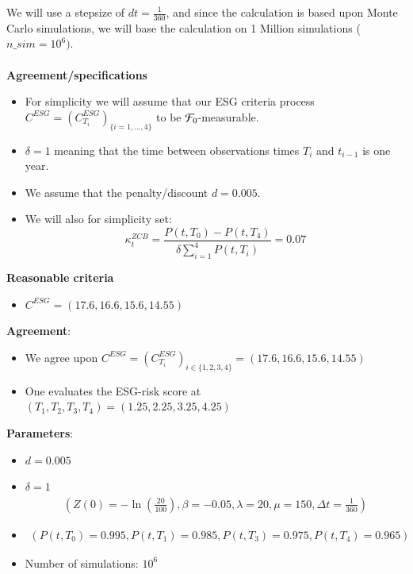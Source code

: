 We will use a stepsize of $dt = \frac{1}{360}$, and since the calculation is based upon Monte Carlo simulations, we will base the calculation on 1 Million simulations ($n\_sim = 10^{6})$. 
\\~\\ 
\textbf{Agreement/specifications}
\begin{itemize}
    \item For simplicity we will assume that our ESG criteria process $C^{ESG} = (C^{ESG}_{T_{i}})_{
    \{i=1, \dots, 4\}}$ to be $\mathcal{F}_{0}$-measurable. 
    \item $\delta = 1$ meaning that the time between observations times $T_{i}$ and $t_{i-1}$ is one year. 
    \item We assume that the penalty/discount $d = 0.005$.
    \item We will also for simplicity set: 
    \[
    \kappa_{t}^{ZCB} = \frac{P(t,T_{0})-P(t,T_{4})}{\delta \sum_{i=1}^{4}P(t,T_{i})} = 0.07
    \]
\end{itemize}
\newpage 

\textbf{Reasonable criteria}
\begin{itemize}
    \item $C^{ESG} = (17.6, 16.6, 15.6, 14.55)$
\end{itemize}



\newpage 


\textbf{Agreement}: 
\begin{itemize}[leftmargin =*]
    \item We agree upon $C^{ESG} = (C_{T_{i}}^{ESG})_{i\in \{1,2,3,4\}} = (17.6, 16.6, 15.6, 14.55)$ 
    \item One evaluates the ESG-risk score at $(T_{1}, T_{2}, T_{3}, T_{4}) = (1.25, 2.25, 3.25, 4.25)$
\end{itemize}

\textbf{Parameters}:
\begin{itemize}
    \item $d = 0.005$
    \item $\delta = 1$
    \begin{align*}
    \left(
    Z(0) = -\ln(\frac{20}{100}), \beta = -0.05, \lambda = 20, \mu = 150, \Delta t = \frac{1}{360}
    \right)   
\end{align*} 
    \item \begin{align*}
        \left(
        P(t,T_{0}) = 0.995, P(t,T_{1}) = 0.985, P(t,T_{3}) = 0.975, P(t,T_{4}) = 0.965
        \right)
    \end{align*}
    \item Number of simulations: $10^{6}$
\end{itemize}

